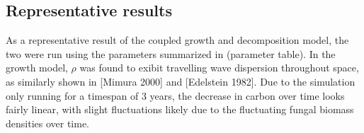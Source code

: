 \documentclass[10pt]{article}
\begin{document}
\subsection*{Representative results}
As a representative result of the coupled growth and decomposition model, the two were run using the parameters summarized in (parameter table). In the growth model, $\rho$ was found to exibit travelling wave dispersion throughout space, as similarly shown in [Mimura 2000] and [Edelstein 1982]. Due to the simulation only running for a timespan of 3 years, the decrease in carbon over time looks fairly linear, with slight fluctuations likely due to the fluctuating fungal biomass densities over time.
\end{document}
